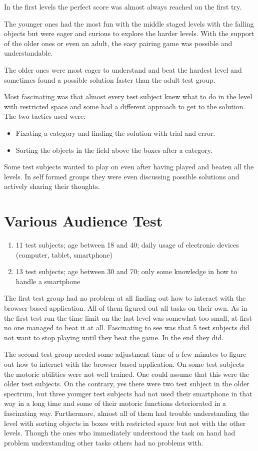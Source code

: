 In the first levels the perfect score was almost always reached on the first try.

The younger ones had the most fun with the middle staged levels with the falling objects but were eager and curious
to explore the harder levels. With the support of the older ones or even an adult, the easy pairing game
was possible and understandable.

The older ones were most eager to understand and beat the hardest level and sometimes found a possible solution
faster than the adult test group.

Most fascinating was that almost every test subject knew what to do in the level with restricted space and
some had a different approach to get to the solution. The two tactics used were:

\begin{itemize}
    \item Fixating a category and finding the solution with trial and error.
    \item Sorting the objects in the field above the boxes after a category.
\end{itemize}

Some test subjects wanted to play on even after having played and beaten all the levels.
In self formed groups they were even discussing possible solutions and actively sharing their thoughts.

\section{Various Audience Test}\label{sec:various-audience-test}
\begin{enumerate}
    \item 11 test subjects; age between 18 and 40; daily usage of electronic devices (computer, tablet, smartphone)
    \item 13 test subjects; age between 30 and 70; only some knowledge in how to handle a smartphone
\end{enumerate}

The first test group had no problem at all finding out how to interact with the browser based application.
All of them figured out all tasks on their own.
As in the first test run the time limit on the last level was somewhat too small,
at first no one managed to beat it at all.
Fascinating to see was that 5 test subjects did not want to stop playing until they beat the game.
In the end they did.

The second test group needed some adjustment time of a few minutes to figure out how to interact with the browser based application.
On some test subjects the motoric abilities were not well trained. One could assume that this were the older
test subjects. On the contrary, yes there were two test subject in the older spectrum, but three younger test subjects
had not used their smartphone in that way in a long time and some of their motoric functions deteriorated
in a fascinating way.
Furthermore, almost all of them had trouble understanding the level with sorting objects in boxes with restricted space
but not with the other levels.
Though the ones who immediately understood the task on hand had problem understanding other tasks others had no problems with.

